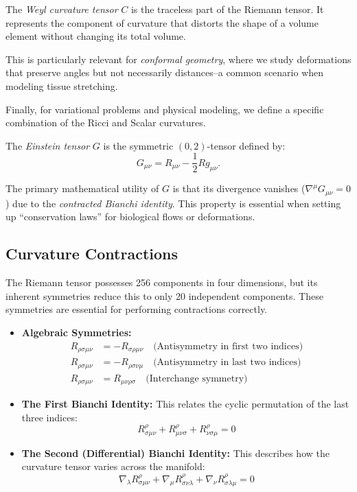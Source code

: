 \begin{definition}
  The \emph{Weyl curvature tensor} $C$ is the traceless part of the Riemann tensor. It represents the component of curvature that distorts the shape of a volume element without changing its total volume.
\end{definition}

This is particularly relevant for \emph{conformal geometry}, where we study deformations that preserve angles but not necessarily distances--a common scenario when modeling tissue stretching.

Finally, for variational problems and physical modeling, we define a specific combination of the Ricci and Scalar curvatures.

\begin{definition}
  The \emph{Einstein tensor} $G$ is the symmetric $(0,2)$-tensor defined by:
  \[%
    G_{\mu\nu} = R_{\mu\nu} - \frac{1}{2} R g_{\mu\nu}
  .\]%
\end{definition}

The primary mathematical utility of $G$ is that its divergence vanishes ($\nabla^\mu G_{\mu\nu} = 0$) due to the \emph{contracted Bianchi identity}. This property is essential when setting up ``conservation laws'' for biological flows or deformations.

\subsection{Curvature Contractions} The Riemann tensor possesses 256 components in four dimensions, but its inherent symmetries reduce this to only 20 independent components. These symmetries are essential for performing contractions correctly.

\begin{itemize}
  \item \textbf{Algebraic Symmetries:}
    \begin{align}
      R_{\rho\sigma\mu\nu} &= -R_{\sigma\rho\mu\nu} \quad \text{(Antisymmetry in first two indices)} \\
      R_{\rho\sigma\mu\nu} &= -R_{\rho\sigma\nu\mu} \quad \text{(Antisymmetry in last two indices)} \\
      R_{\rho\sigma\mu\nu} &= R_{\mu\nu\rho\sigma} \quad \text{(Interchange symmetry)}
    \end{align}

  \item \textbf{The First Bianchi Identity:} This relates the cyclic permutation of the last three indices:
    \[ R^\rho_{\sigma\mu\nu} + R^\rho_{\mu\nu\sigma} + R^\rho_{\nu\sigma\mu} = 0 \]

  \item \textbf{The Second (Differential) Bianchi Identity:} This describes how the curvature tensor varies across the manifold:
    \[ \nabla_\lambda R^\rho_{\sigma\mu\nu} + \nabla_\mu R^\rho_{\sigma\nu\lambda} + \nabla_\nu R^\rho_{\sigma\lambda\mu} = 0 \]
\end{itemize}

